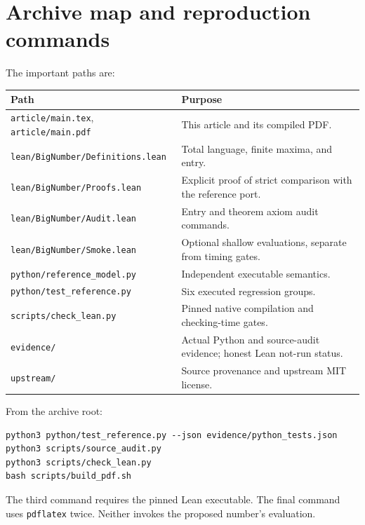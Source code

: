 \documentclass[11pt]{article}
\theoremstyle{definition}
\begin{document}
\section{Archive map and reproduction commands}
The important paths are:
\begin{center}\small
\begin{tabular}{p{}p{}}
\toprule
Path & Purpose\\
\midrule
\texttt{article/main.tex}, \texttt{article/main.pdf} & This article and its compiled PDF.\\
\texttt{lean/BigNumber/Definitions.lean} & Total language, finite maxima, and entry.\\
\texttt{lean/BigNumber/Proofs.lean} & Explicit proof of strict comparison with the reference port.\\
\texttt{lean/BigNumber/Audit.lean} & Entry and theorem axiom audit commands.\\
\texttt{lean/BigNumber/Smoke.lean} & Optional shallow evaluations, separate from timing gates.\\
\texttt{python/reference\_model.py} & Independent executable semantics.\\
\texttt{python/test\_reference.py} & Six executed regression groups.\\
\texttt{scripts/check\_lean.py} & Pinned native compilation and checking-time gates.\\
\texttt{evidence/} & Actual Python and source-audit evidence; honest Lean not-run status.\\
\texttt{upstream/} & Source provenance and upstream MIT license.\\
\bottomrule
\end{tabular}
\end{center}
From the archive root:
\begin{lstlisting}
python3 python/test_reference.py --json evidence/python_tests.json
python3 scripts/source_audit.py
python3 scripts/check_lean.py
bash scripts/build_pdf.sh
\end{lstlisting}
The third command requires the pinned Lean executable. The final command uses
\texttt{pdflatex} twice. Neither invokes the proposed number's evaluation.
\end{document}
